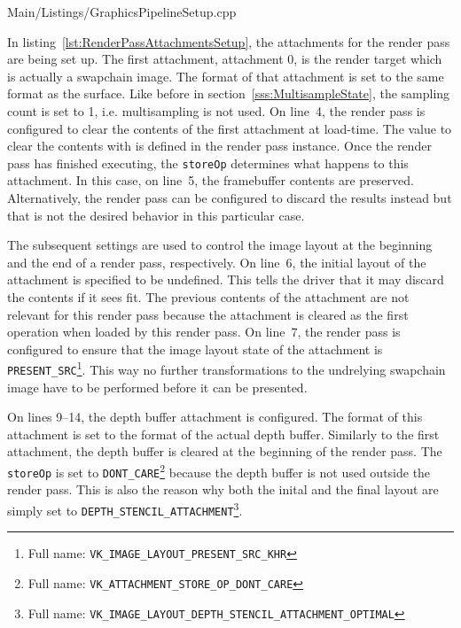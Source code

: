
        
        {Main/Listings/GraphicsPipelineSetup.cpp}

        In listing~\ref{lst:RenderPassAttachmentsSetup}, the attachments for the render pass are being set up.
        The first attachment, attachment 0, is the render target which is actually a swapchain image.
        The format of that attachment is set to the same format as the surface.
        Like before in section~\ref{sss:MultisampleState}, the sampling count is set to 1, i.e. multisampling is not used.
        On line~4, the render pass is configured to clear the contents of the first attachment at load-time.
        The value to clear the contents with is defined in the render pass instance.
        Once the render pass has finished executing, the \lstinline{storeOp} determines what happens to this attachment.
        In this case, on line~5, the framebuffer contents are preserved.
        Alternatively, the render pass can be configured to discard the results instead but that is not the desired behavior in this particular case.

        The subsequent settings are used to control the image layout at the beginning and the end of a render pass, respectively.
        On line~6, the initial layout of the attachment is specified to be undefined.
        This tells the \gls{driver} that it may discard the contents if it sees fit.
        The previous contents of the attachment are not relevant for this render pass because the attachment is cleared as the first operation when loaded by this render pass.
        On line~7, the render pass is configured to ensure that the image layout state of the attachment is \lstinline{PRESENT_SRC}\footnote{Full name: \lstinline{VK_IMAGE_LAYOUT_PRESENT_SRC_KHR}}.
        This way no further transformations to the undrelying swapchain image have to be performed before it can be presented.

        On lines 9--14, the depth buffer attachment is configured.
        The format of this attachment is set to the format of the actual depth buffer.
        Similarly to the first attachment, the depth buffer is cleared at the beginning of the render pass.
        The \lstinline{storeOp} is set to \lstinline{DONT_CARE}\footnote{Full name: \lstinline{VK_ATTACHMENT_STORE_OP_DONT_CARE}} because the depth buffer is not used outside the render pass.
        This is also the reason why both the inital and the final layout are simply set to \lstinline{DEPTH_STENCIL_ATTACHMENT}\footnote{Full name: \lstinline{VK_IMAGE_LAYOUT_DEPTH_STENCIL_ATTACHMENT_OPTIMAL}}.

